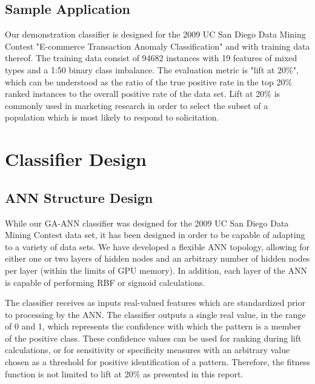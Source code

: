 \documentclass[11pt]{article}       %
\begin{document}
\subsection{Sample Application} \label{contest}
Our demonstration classifier is designed for the 2009 UC San Diego Data Mining Contest "E-commerce Transaction Anomaly Classification" \cite{UCSG-Contest} and with training data thereof. The training data consist of 94682 instances with 19 features of mixed types and a 1:50 binary class imbalance. The evaluation metric is "lift at 20\%", which can be understood as the ratio of the true positive rate in the top 20\% ranked instances to the overall positive rate of the data set.  Lift at 20\% is commonly used in marketing research in order to select the subset of a population which is most likely to respond to solicitation.

\section{Classifier Design} \label{design}

\subsection{ANN Structure Design} \label{ann}

While our GA-ANN classifier was designed for the 2009 UC San Diego Data Mining Contest data set, it has been designed in order to be capable of adapting to a variety of data sets.  We have developed a flexible ANN topology, allowing for either one or two layers of hidden nodes and an arbitrary number of hidden nodes per layer (within the limits of GPU memory). In addition, each layer of the ANN is capable of performing RBF or sigmoid calculations.

The classifier receives as inputs real-valued features which are standardized prior to processing by the ANN.  The classifier outputs a single real value, in the range of 0 and 1, which represents the confidence with which the pattern is a member of the positive class.  These confidence values can be used for ranking during lift calculations, or for sensitivity or specificity measures with an arbitrary value chosen as a threshold for positive identification of a pattern.  Therefore, the fitness function is not limited to lift at 20\% as presented in this report.
\end{document}
